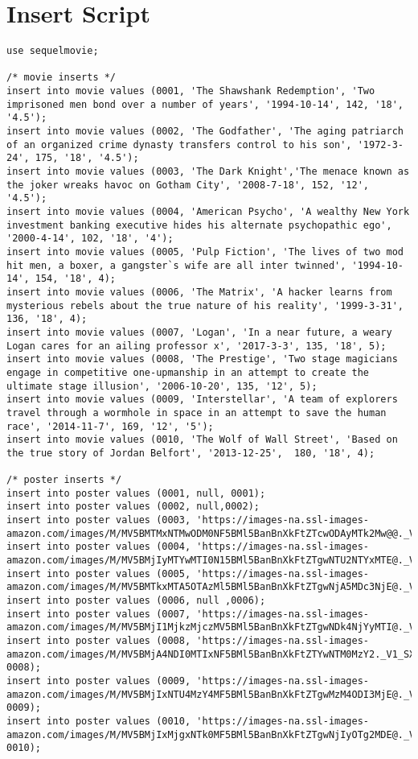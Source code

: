 \documentclass[12pt]{article}
\begin{document}
\section{Insert Script}
\begin{lstlisting}
use sequelmovie;

/* movie inserts */
insert into movie values (0001, 'The Shawshank Redemption', 'Two imprisoned men bond over a number of years', '1994-10-14', 142, '18', '4.5');
insert into movie values (0002, 'The Godfather', 'The aging patriarch of an organized crime dynasty transfers control to his son', '1972-3-24', 175, '18', '4.5');
insert into movie values (0003, 'The Dark Knight','The menace known as the joker wreaks havoc on Gotham City', '2008-7-18', 152, '12', '4.5');
insert into movie values (0004, 'American Psycho', 'A wealthy New York investment banking executive hides his alternate psychopathic ego', '2000-4-14', 102, '18', '4');
insert into movie values (0005, 'Pulp Fiction', 'The lives of two mod hit men, a boxer, a gangster`s wife are all inter twinned', '1994-10-14', 154, '18', 4);
insert into movie values (0006, 'The Matrix', 'A hacker learns from mysterious rebels about the true nature of his reality', '1999-3-31', 136, '18', 4);
insert into movie values (0007, 'Logan', 'In a near future, a weary Logan cares for an ailing professor x', '2017-3-3', 135, '18', 5);
insert into movie values (0008, 'The Prestige', 'Two stage magicians engage in competitive one-upmanship in an attempt to create the ultimate stage illusion', '2006-10-20', 135, '12', 5);
insert into movie values (0009, 'Interstellar', 'A team of explorers travel through a wormhole in space in an attempt to save the human race', '2014-11-7', 169, '12', '5');
insert into movie values (0010, 'The Wolf of Wall Street', 'Based on the true story of Jordan Belfort', '2013-12-25',  180, '18', 4);

/* poster inserts */
insert into poster values (0001, null, 0001);
insert into poster values (0002, null,0002);
insert into poster values (0003, 'https://images-na.ssl-images-amazon.com/images/M/MV5BMTMxNTMwODM0NF5BMl5BanBnXkFtZTcwODAyMTk2Mw@@._V1_SX300.jpg',0003);
insert into poster values (0004, 'https://images-na.ssl-images-amazon.com/images/M/MV5BMjIyMTYwMTI0N15BMl5BanBnXkFtZTgwNTU2NTYxMTE@._V1_SX300.jpg',0004);
insert into poster values (0005, 'https://images-na.ssl-images-amazon.com/images/M/MV5BMTkxMTA5OTAzMl5BMl5BanBnXkFtZTgwNjA5MDc3NjE@._V1_SX300.jpg',0005);
insert into poster values (0006, null ,0006);
insert into poster values (0007, 'https://images-na.ssl-images-amazon.com/images/M/MV5BMjI1MjkzMjczMV5BMl5BanBnXkFtZTgwNDk4NjYyMTI@._V1_SX300.jpg',0007);
insert into poster values (0008, 'https://images-na.ssl-images-amazon.com/images/M/MV5BMjA4NDI0MTIxNF5BMl5BanBnXkFtZTYwNTM0MzY2._V1_SX300.jpg', 0008);
insert into poster values (0009, 'https://images-na.ssl-images-amazon.com/images/M/MV5BMjIxNTU4MzY4MF5BMl5BanBnXkFtZTgwMzM4ODI3MjE@._V1_SX300.jpg', 0009);
insert into poster values (0010, 'https://images-na.ssl-images-amazon.com/images/M/MV5BMjIxMjgxNTk0MF5BMl5BanBnXkFtZTgwNjIyOTg2MDE@._V1_SX300.jpg', 0010);


\end{lstlisting}
\end{document}
